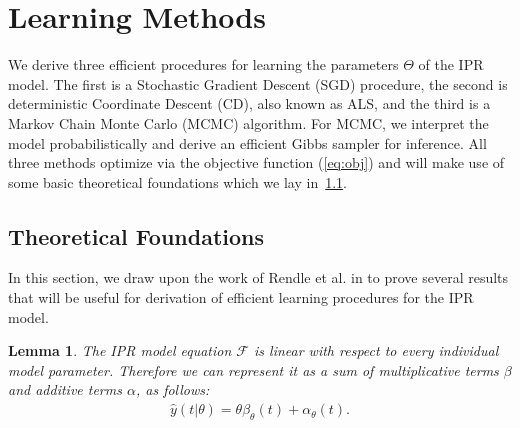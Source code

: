 \documentclass[10pt]{proc}
\newtheorem{lemma}{Lemma}
\begin{document}
\section{Learning Methods}

We derive three efficient procedures for learning the parameters
$\Theta$ of the IPR model. The first is a Stochastic Gradient Descent (SGD)
procedure, the second is deterministic Coordinate Descent (CD), also known as
ALS, and the third is a Markov Chain Monte Carlo (MCMC) algorithm. For MCMC, we
interpret the model probabilistically and derive an efficient Gibbs sampler for
inference. All three methods optimize via the objective function (\ref{eq:obj})
and will make use of some basic theoretical foundations which we lay
in~\ref{theoretical-foundations}.


\subsection{Theoretical Foundations} \label{theoretical-foundations}

In this section, we draw upon the work of Rendle et al. in
\cite{rendle_fast_2011} to prove several results that will be useful for
derivation of efficient learning procedures for the IPR model.

\begin{lemma}
    The IPR model equation $\mathcal{F}$ is linear with respect to every
    individual model parameter. Therefore we can represent it as a sum of
    multiplicative terms $\beta$ and additive terms $\alpha$, as follows:
    \begin{align}  \label{eq:yhat-decomp}
        \hat{y}(t | \theta) = \theta\beta_\theta(t) + \alpha_\theta(t).
    \end{align}
\end{lemma}
\end{document}
